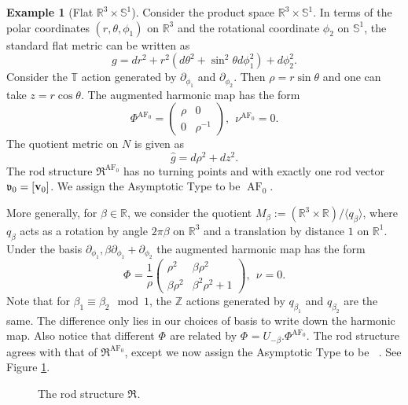 \documentclass[a4paper,11pt]{amsart}
\theoremstyle{definition}
\newtheorem{example}[theorem]{Example}
\numberwithin{equation}{section}
\newcommand{\p}{\partial}
\newcommand{\R}{\mathbb{R}}
\newcommand{\dT}{\mathbb{T}}
\newcommand{\dS}{\mathbb{S}}
\newcommand{\mv} {\mathfrak v}
\newcommand{\mR} {\mathfrak R}
\DeclareMathOperator{\bv}{{\bf v}}
\DeclareMathOperator{\AF}{AF}
\DeclareMathOperator{\AFa}{AF_\beta}
\begin{document}
\begin{example}[Flat $\R^3\times \dS^1$]\label{ex:AF}
Consider the product space $\R^3\times \dS^1$. In terms of the polar coordinates $(r,\theta, \phi_1)$ on $\R^3$ and the rotational coordinate $\phi_2$ on $\dS^1$, the standard flat metric can be written as
$$g=dr^2+r^2(d\theta^2+\sin^2\theta d\phi_1^2)+d\phi_2^2.$$
Consider the $\dT$ action generated by $\p_{\phi_1}$ and $\p_{\phi_2}$. Then $\rho=r\sin\theta$ and one can take $z=r\cos\theta$. The augmented  harmonic map has the form
\begin{equation}\label{e:standard harmonic map AF}\Phi^{\AF_0}=\begin{pmatrix}
\rho & 0 \\
0 & \rho^{-1}
\end{pmatrix}, \ \ \nu^{\AF_0}=0.
\end{equation}
The quotient metric on $N$ is given as $$\widehat g=d\rho^2+dz^2.$$  
The rod structure $\mR^{\AF_0}$ has no turning points and with exactly one rod vector $\mv_0=[\bv_0]$. We assign the Asymptotic Type to be $\AF_0$. 

More generally, for $\beta\in \mathbb R$, we  consider the quotient $M_\beta:=(\R^3\times \R)/\langle q_\beta\rangle$,  where $q_\beta$ acts as a rotation by angle $2\pi\beta$ on $\R^3$ and a translation by distance $1$ on $\R^1$. Under the basis $\partial_{\phi_1},\beta\partial_{\phi_1}+\partial_{\phi_2}$ the augmented harmonic map has the form
 \begin{equation}
	\Phi^{\AFa}=\frac{1}{\rho}\left(\begin{matrix}\rho^2&\beta\rho^2\\\beta\rho^2&\beta^2\rho^2+1\end{matrix}\right), \ \ \nu^{\AFa}=0.
\end{equation}
Note that for $\beta_1\equiv\beta_2 \mod 1$, the $\mathbb Z$ actions generated by $q_{\beta_1}$ and $q_{\beta_2}$ are the same. The difference only lies in our choices of basis to write down the harmonic map. Also notice that different $\Phi^{\AFa}$ are related by $\Phi^{\AFa}=U_{-\beta}.\Phi^{\AF_0}$. The rod structure agrees with that of $\mR^{\AF_0}$, except we now assign the Asymptotic Type to be $\AFa$. See Figure \ref{Figure:rod structure for R^AF}.

\begin{figure}[ht]
	\caption{The rod structure $\mR^{\AFa}$.}
	 \label{Figure:rod structure for R^AF}   
    \end{figure}
\end{example}
\end{document}
